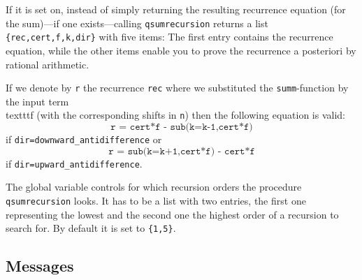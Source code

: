 \begin{itemize}
		If it is set on, instead of simply returning the
		resulting recurrence equation (for the sum)---if one
		exists---calling \texttt{qsumrecursion} returns
		a list \texttt{\{rec,cert,f,k,dir\}} with
		five items: The first entry contains the
		recurrence equation, while the other items enable you to
		prove the recurrence a posteriori by rational arithmetic.

		If we denote by \texttt{r} the recurrence
		\texttt{rec} where we substituted the \texttt{summ}-function
		by the input term \\texttt{f} (with the corresponding shifts
		in \texttt{n}) then the following equation is valid:
		\[  \texttt{r = cert*f - sub(k=k-1,cert*f)}  \]
                if \texttt{dir=downward\_antidifference}
		or
		\[  \texttt{r = sub(k=k+1,cert*f) - cert*f}  \]
		if \texttt{dir=upward\_antidifference}.
\end{itemize}

The global variable  controls for
which recursion orders the procedure \texttt{qsumrecursion} looks.
It has to be a list with two entries, the first one representing
the lowest and the second one the highest order of a recursion
to search for. By default it is set to \texttt{\{1,5\}}.


\subsection{Messages}

